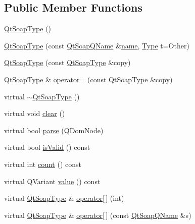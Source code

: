 \subsection*{Public Member Functions}
\begin{DoxyCompactItemize}
\item 
\mbox{\hyperlink{class_qt_soap_type_a8bc4a7b3e1d27a30a52ce1f05bddb6f2}{Qt\+Soap\+Type}} ()
\item 
\mbox{\hyperlink{class_qt_soap_type_a70eb2a6c11ab1d10bf2aaa5b78450db2}{Qt\+Soap\+Type}} (const \mbox{\hyperlink{class_qt_soap_q_name}{Qt\+Soap\+Q\+Name}} \&\mbox{\hyperlink{class_qt_soap_type_a6d5fb3d1ea4cf6d1432c7f62a5da09c3}{name}}, \mbox{\hyperlink{class_qt_soap_type_a840b69f1d92eeb4e64ae1e0439d54683}{Type}} t=Other)
\item 
\mbox{\hyperlink{class_qt_soap_type_afedef32defaffd10424deb2c38fde2e2}{Qt\+Soap\+Type}} (const \mbox{\hyperlink{class_qt_soap_type}{Qt\+Soap\+Type}} \&copy)
\item 
\mbox{\hyperlink{class_qt_soap_type}{Qt\+Soap\+Type}} \& \mbox{\hyperlink{class_qt_soap_type_a8b7eb83f5d0ff312db12e7c780bd2a28}{operator=}} (const \mbox{\hyperlink{class_qt_soap_type}{Qt\+Soap\+Type}} \&copy)
\item 
virtual \mbox{\hyperlink{class_qt_soap_type_aeb5690cc94b2ce5ff2ea6fa862ddb838}{$\sim$\+Qt\+Soap\+Type}} ()
\item 
virtual void \mbox{\hyperlink{class_qt_soap_type_a9fac9664d334143114c31610ef02c53d}{clear}} ()
\item 
virtual bool \mbox{\hyperlink{class_qt_soap_type_a935516be4d70dda7e0f7fef889b1a2b8}{parse}} (Q\+Dom\+Node)
\item 
virtual bool \mbox{\hyperlink{class_qt_soap_type_a3b659f89a768ca3503fc86086bb987f6}{is\+Valid}} () const
\item 
virtual int \mbox{\hyperlink{class_qt_soap_type_a8d6c4868a786f3b7fd6784a45501e16f}{count}} () const
\item 
virtual Q\+Variant \mbox{\hyperlink{class_qt_soap_type_a2fc88aa456ba9eee2cd74902be50fbb3}{value}} () const
\item 
virtual \mbox{\hyperlink{class_qt_soap_type}{Qt\+Soap\+Type}} \& \mbox{\hyperlink{class_qt_soap_type_a3b8735f02d9628294bb3f2c6f4fbae20}{operator\mbox{[}$\,$\mbox{]}}} (int)
\item 
virtual \mbox{\hyperlink{class_qt_soap_type}{Qt\+Soap\+Type}} \& \mbox{\hyperlink{class_qt_soap_type_a3e68e0947456b6d4533f6fe30f1ac17a}{operator\mbox{[}$\,$\mbox{]}}} (const \mbox{\hyperlink{class_qt_soap_q_name}{Qt\+Soap\+Q\+Name}} \&s)

\end{DoxyCompactItemize}

